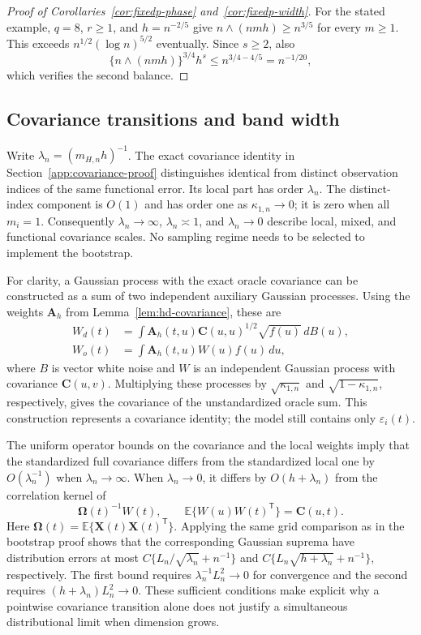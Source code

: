 \documentclass[12pt]{article}
\newcommand{\bA}{{\mathbf A}}
\newcommand{\bC}{{\mathbf C}}
\newcommand{\bX}{{\mathbf X}}
\newcommand{\bOmega} {\boldsymbol{\Omega}}
\newcommand{\expect}{\mathbb{E}}
\newcommand{\trans}{{\scriptscriptstyle\mathsf{T}}}
\numberwithin{equation}{section}
\begin{document}
\begin{proof}[Proof of Corollaries~\ref{cor:fixedp-phase} and~\ref{cor:fixedp-width}]
For the stated example, $q=8$, $r\ge1$, and $h=n^{-2/5}$ give
$n\wedge(nmh)\ge n^{3/5}$ for every $m\ge1$. This exceeds
$n^{1/2}(\log n)^{5/2}$ eventually. Since $s\ge2$, also
\[
\{n\wedge(nmh)\}^{3/4}h^s
\le n^{3/4-4/5}=n^{-1/20},
\]
which verifies the second balance.
\end{proof}

\subsection{Covariance transitions and band width}
\label{app:proof-phase-components}

Write $\lambda_n=(m_{H,n}h)^{-1}$. The exact covariance identity in
Section~\ref{app:covariance-proof} distinguishes identical from distinct
observation indices of the same functional error. Its local part has
order $\lambda_n$. The distinct-index component is $O(1)$ and has
order one as $\kappa_{1,n}\to0$; it is zero when all $m_i=1$. Consequently
$\lambda_n\to\infty$, $\lambda_n\asymp1$, and $\lambda_n\to0$
describe local, mixed, and functional covariance scales. No sampling regime
needs to be selected to implement the bootstrap.

For clarity, a Gaussian process with the exact oracle covariance can be
constructed as a sum of two independent auxiliary Gaussian processes.
Using the weights $\bA_h$ from Lemma~\ref{lem:hd-covariance}, these are
\[
\begin{aligned}
W_d(t)&=\int\bA_h(t,u)\bC(u,u)^{1/2}\sqrt{f(u)}\,dB(u),\\
W_o(t)&=\int\bA_h(t,u)W(u)f(u)\,du,
\end{aligned}
\]
where $B$ is vector white noise and $W$ is an independent Gaussian
process with covariance $\bC(u,v)$.
Multiplying these processes by $\sqrt{\kappa_{1,n}}$ and
$\sqrt{1-\kappa_{1,n}}$, respectively, gives the covariance of the
unstandardized oracle sum. This construction represents a covariance
identity; the model still contains only $\varepsilon_i(t)$.

The uniform operator bounds on the covariance and the local weights imply
that the standardized full covariance differs from the standardized local
one by $O(\lambda_n^{-1})$ when $\lambda_n\to\infty$.
When $\lambda_n\to0$, it differs by $O(h+\lambda_n)$ from the correlation
kernel of
\[
\bOmega(t)^{-1}W(t),\qquad
\expect\{W(u)W(t)^\trans\}=\bC(u,t).
\]
Here $\bOmega(t)=\expect\{\bX(t)\bX(t)^\trans\}$.
Applying the same grid comparison as in the bootstrap proof shows that
the corresponding Gaussian suprema have distribution errors at most
$C\{L_n/\sqrt{\lambda_n}+n^{-1}\}$ and
$C\{L_n\sqrt{h+\lambda_n}+n^{-1}\}$, respectively.
The first bound requires $\lambda_n^{-1}L_n^2\to0$ for convergence and
the second requires $(h+\lambda_n)L_n^2\to0$.
These sufficient conditions make explicit why a pointwise covariance
transition alone does not justify a simultaneous distributional limit
when dimension grows.
\end{document}
